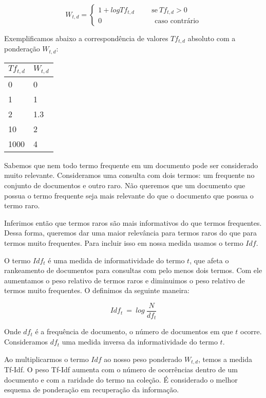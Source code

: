 \documentclass[a4paper,12pt]{article}
\begin{document}
  $$W_{t,d}=\begin{cases}
             1 + logTf_{t,d}  \hspace{1cm} \text{se} \ Tf_{t,d} > 0 \\
             0 \ \hspace{3cm} \text{caso contrário}
            \end{cases}
 $$
 
 
 Exemplificamos abaixo a correspondência de valores $Tf_{t,d}$ absoluto com a ponderação $W_{t,d}$:
 
 \begin{center}
  \begin{tabular}{ll}
    \hline
    $Tf_{t,d}$ & $W_{t,d}$\\
    \hline
    0&0\\
    1&1\\
    2&1.3\\
    10&2\\
    1000&4\\
    
  \end{tabular}
 \end{center}
 
 
  Sabemos que nem todo termo frequente em um documento pode ser considerado muito relevante. Consideramos uma consulta com dois termos:
  um frequente no conjunto de documentos e outro raro. Não queremos que um documento que possua o termo frequente seja mais relevante do que o
  documento que possua o termo raro.

  Inferimos então que termos raros são mais informativos do que termos frequentes. Dessa forma, queremos dar uma maior relevância para
  termos raros do que para termos muito frequentes. Para incluir isso em nossa medida usamos o termo $Idf$.
  
  O termo $Idf_{t}$ é uma medida de informatividade do termo $t$, que afeta o rankeamento de documentos para consultas com pelo menos dois
  termos. Com ele aumentamos o peso relativo de termos raros e diminuimos o peso relativo
  de termos muito frequentes. O definimos da seguinte maneira:
  
  $$ Idf_{t}\ = \ log\ \frac{N}{df_{t}}$$
  
  Onde $df_{t}$ é a frequência de documento, o número de documentos em que $t$ ocorre. Consideramos $df_{t}$ uma medida inversa da informatividade
  do termo $t$.
  
  Ao multiplicarmos o termo $Idf$ ao nosso peso ponderado $W_{t,d}$, temos a medida Tf-Idf. O peso Tf-Idf aumenta com o número de ocorrências
  dentro de um documento e com a raridade do termo na coleção. É considerado o melhor esquema de ponderação em recuperação da informação.
  
\end{document}
